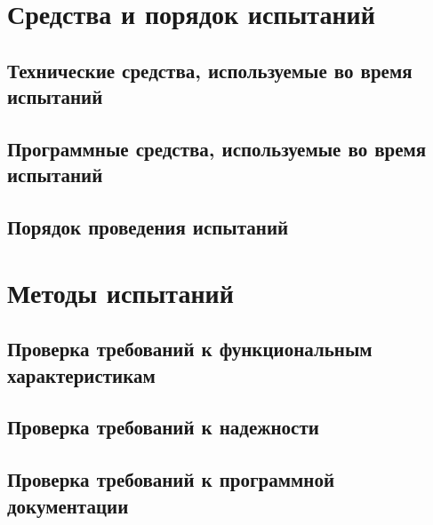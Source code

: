 \documentclass[a4paper,12pt]{article}
\begin{document}
						\newpage
	\section{Средства и порядок испытаний}
	\subsection{Технические средства, используемые во время испытаний}
	\subsection{Программные средства, используемые во время испытаний}
	\subsection{Порядок проведения испытаний}
	
						\newpage
	\section{Методы испытаний}
	\subsection{Проверка требований к функциональным характеристикам}
	\subsection{Проверка требований к надежности}
	\subsection{Проверка требований к программной документации}
	
						\newpage
	\listRegistration
\end{document}
